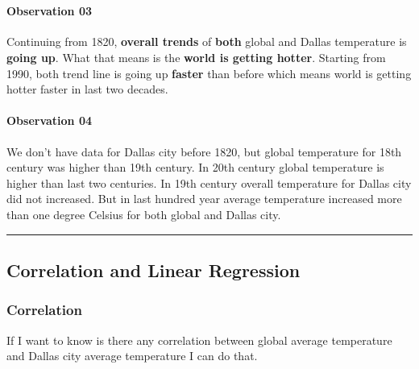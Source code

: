 \documentclass[11pt]{article}
\begin{document}
    \begin{center}
    \end{center}
    { \hspace*{\fill} \\}
    
    \paragraph{Observation 03}\label{observation-03}

    Continuing from 1820, \textbf{overall trends} of \textbf{both} global
and Dallas temperature is \textbf{going up}. What that means is the
\textbf{world is getting hotter}. Starting from 1990, both trend line is
going up \textbf{faster} than before which means world is getting hotter
faster in last two decades.

    \paragraph{Observation 04}\label{observation-04}

    We don't have data for Dallas city before 1820, but global temperature
for 18th century was higher than 19th century. In 20th century global
temperature is higher than last two centuries. In 19th century overall
temperature for Dallas city did not increased. But in last hundred year
average temperature increased more than one degree Celsius for both
global and Dallas city.

    \begin{center}\rule{0.5\linewidth}{\linethickness}\end{center}

    \subsection{Correlation and Linear
Regression}\label{correlation-and-linear-regression}

    \subsubsection{Correlation}\label{correlation}

    If I want to know is there any correlation between global average
temperature and Dallas city average temperature I can do that.
\end{document}
